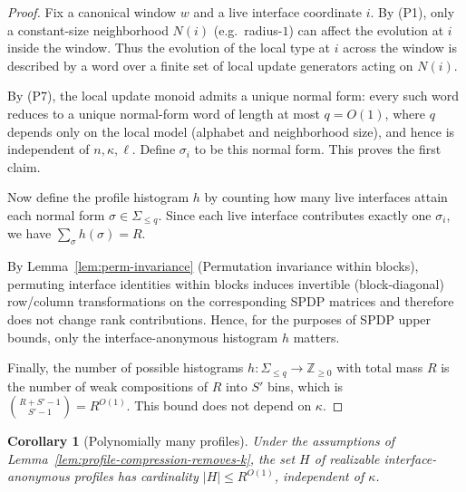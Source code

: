 \documentclass[12pt]{article}
\newtheorem{corollary}[theorem]{Corollary}
\theoremstyle{definition}
\theoremstyle{definition}
\theoremstyle{remark}
\theoremstyle{remark}
\begin{document}
\begin{proof}
Fix a canonical window $w$ and a live interface coordinate $i$.
By (P1), only a constant-size neighborhood $N(i)$ (e.g.\ radius-$1$) can affect
the evolution at $i$ inside the window. Thus the evolution of the local type at
$i$ across the window is described by a word over a finite set of local update
generators acting on $N(i)$.

By (P7), the local update monoid admits a unique normal form: every such word
reduces to a unique normal-form word of length at most $q=O(1)$, where $q$ depends
only on the local model (alphabet and neighborhood size), and hence is independent
of $n,\kappa,\ell$. Define $\sigma_i$ to be this normal form. This proves the first claim.

Now define the profile histogram $h$ by counting how many live interfaces attain
each normal form $\sigma\in\Sigma_{\le q}$. Since each live interface contributes
exactly one $\sigma_i$, we have $\sum_{\sigma} h(\sigma)=R$.

By Lemma~\ref{lem:perm-invariance} (Permutation invariance within blocks),
permuting interface identities within blocks induces invertible (block-diagonal)
row/column transformations on the corresponding SPDP matrices and therefore does
not change rank contributions. Hence, for the purposes of SPDP upper bounds, only
the interface-anonymous histogram $h$ matters.

Finally, the number of possible histograms $h:\Sigma_{\le q}\to\mathbb{Z}_{\ge 0}$
with total mass $R$ is the number of weak compositions of $R$ into $S'$ bins, which
is $\binom{R+S'-1}{S'-1}=R^{O(1)}$. This bound does not depend on $\kappa$.
\end{proof}

\begin{corollary}[Polynomially many profiles]
\label{cor:poly-many-profiles}
Under the assumptions of Lemma~\ref{lem:profile-compression-removes-k},
the set $H$ of realizable interface-anonymous profiles has cardinality
$|H|\le R^{O(1)}$, independent of $\kappa$.
\end{corollary}
\end{document}
